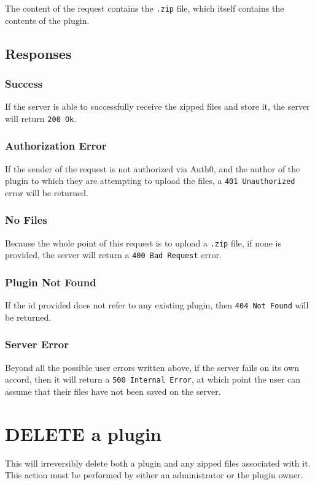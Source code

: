 \documentclass[a4paper, 12pt]{article}
\begin{document}
			The content of the request contains the \verb|.zip| file, which itself contains the contents of the plugin.

		\subsection{Responses}
			\subsubsection{Success}
				If the server is able to successfully receive the zipped files and store it, the server will return \verb|200 Ok|.

			\subsubsection{Authorization Error}
				If the sender of the request is not authorized via Auth0, and the author of the plugin to which they are attempting to upload the files, a \verb|401 Unauthorized| error will be returned.

			\subsubsection{No Files}
				Because the whole point of this request is to upload a \verb|.zip| file, if none is provided, the server will return a \verb|400 Bad Request| error.

			\subsubsection{Plugin Not Found}
				If the id provided does not refer to any existing plugin, then \verb|404 Not Found| will be returned.

			\subsubsection{Server Error}
				Beyond all the possible user errors written above, if the server fails on its own accord, then it will return a \verb|500 Internal Error|, at which point the user can assume that their files have not been saved on the server.

	\section{DELETE a plugin}
		This will irreversibly delete both a plugin and any zipped files associated with it. This action must be performed by either an administrator or the plugin owner.
\end{document}
